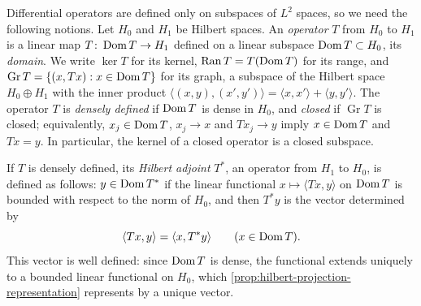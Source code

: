 Differential operators are defined only on subspaces of $L^2$ spaces, so we need the following notions. Let $H_0$ and $H_1$ be Hilbert spaces. An \emph{operator} $T$ from $H_0$ to $H_1$ is a linear map $T\colon\operatorname{Dom} T\to H_1$ defined on a linear subspace $\operatorname{Dom} T\subset H_0$, its \emph{domain}. We write $\ker T$ for its kernel, $\operatorname{Ran}T=T(\operatorname{Dom} T)$ for its range, and $\operatorname{Gr}T=\{(x,Tx):x\in\operatorname{Dom} T\}$ for its graph, a subspace of the Hilbert space $H_0\oplus H_1$ with the inner product $\langle(x,y),(x',y')\rangle=\langle x,x'\rangle+\langle y,y'\rangle$. The operator $T$ is \emph{densely defined} if $\operatorname{Dom} T$ is dense in $H_0$, and \emph{closed} if $\operatorname{Gr}T$ is closed; equivalently, $x_j\in\operatorname{Dom} T$, $x_j\to x$ and $Tx_j\to y$ imply $x\in\operatorname{Dom} T$ and $Tx=y$. In particular, the kernel of a closed operator is a closed subspace.

If $T$ is densely defined, its \emph{Hilbert adjoint} $T^*$, an operator from $H_1$ to $H_0$, is defined as follows: $y\in\operatorname{Dom} T^*$ if the linear functional $x\mapsto\langle Tx,y\rangle$ on $\operatorname{Dom} T$ is bounded with respect to the norm of $H_0$, and then $T^*y$ is the vector determined by
\[
 \langle Tx,y\rangle=\langle x,T^*y\rangle\qquad(x\in\operatorname{Dom} T).
\]
This vector is well defined: since $\operatorname{Dom} T$ is dense, the functional extends uniquely to a bounded linear functional on $H_0$, which \cref{prop:hilbert-projection-representation} represents by a unique vector.

